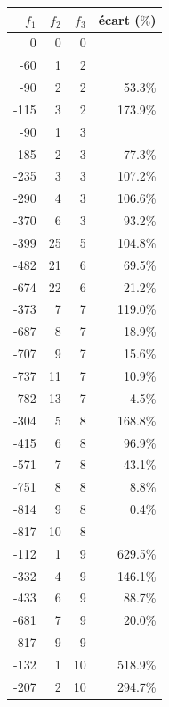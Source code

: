 \documentclass[12pt, a4paper, french, version=last, parskip=half, titlepage]{scrartcl}
\begin{document}
\begin{table}[H]
    \centering
    \begin{tabular}{r r r r}
        \toprule
        $f_1$ & $f_2$ & $f_3$ & écart ($\%$) \\
        \midrule
           0 &  0 &  0           \\
         -60 &  1 &  2           \\
         -90 &  2 &  2 &  53.3\% \\
        -115 &  3 &  2 & 173.9\% \\
         -90 &  1 &  3           \\
        -185 &  2 &  3 &  77.3\% \\
        -235 &  3 &  3 & 107.2\% \\
        -290 &  4 &  3 & 106.6\% \\
        -370 &  6 &  3 &  93.2\% \\
        -399 & 25 &  5 & 104.8\% \\
        -482 & 21 &  6 &  69.5\% \\
        -674 & 22 &  6 &  21.2\% \\
        -373 &  7 &  7 & 119.0\% \\
        -687 &  8 &  7 &  18.9\% \\
        -707 &  9 &  7 &  15.6\% \\
        -737 & 11 &  7 &  10.9\% \\
        -782 & 13 &  7 &   4.5\% \\
        -304 &  5 &  8 & 168.8\% \\
        -415 &  6 &  8 &  96.9\% \\
        -571 &  7 &  8 &  43.1\% \\
        -751 &  8 &  8 &   8.8\% \\
        -814 &  9 &  8 &   0.4\% \\
        -817 & 10 &  8           \\
        -112 &  1 &  9 & 629.5\% \\
        -332 &  4 &  9 & 146.1\% \\
        -433 &  6 &  9 &  88.7\% \\
        -681 &  7 &  9 &  20.0\% \\
        -817 &  9 &  9           \\
        -132 &  1 & 10 & 518.9\% \\
        -207 &  2 & 10 & 294.7\% \\
        \bottomrule
    \end{tabular}

\end{table}
\end{document}
